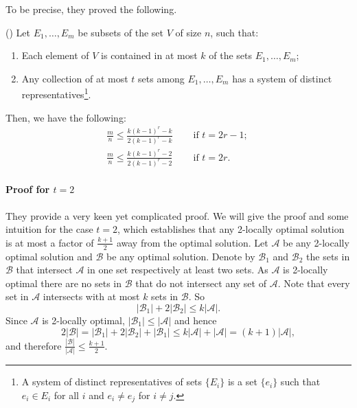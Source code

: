 To be precise, they proved the following.
%
\begin{theorem}\label{thm:HurkensSchrijver}
(\cite[Theorem 1]{HurkensSchrijver}) Let $E_1, \ldots, E_m$ be subsets of the set $V$ of size $n$, such that:
%
\begin{enumerate}
  \item Each element of $V$ is contained in at most $k$ of the sets $E_1, \ldots, E_m$;
  \item Any collection of at most $t$ sets among $E_1, \ldots, E_m$ has a system of distinct representatives\footnote{A system of distinct representatives of sets $\{E_i\}$ is a set $\{e_i\}$ such that $e_i \in E_i$ for all $i$ and $e_i \neq e_j$ for $i \neq j$.}.
\end{enumerate}
%
Then, we have the following:
%
\begin{equation*}
\begin{alignedat}{2}
\frac{m}{n} \leq \frac{ k (k-1)^r - k }{ 2 (k-1)^r - k } \quad & \textrm{ if } t = 2r-1; \ \\
\frac{m}{n} \leq \frac{ k (k-1)^r - 2 }{ 2 (k-1)^r - 2 } \quad & \textrm{ if } t = 2r.
\end{alignedat}
\end{equation*}
\end{theorem}
%
\paragraph{Proof for $t=2$} They provide a very keen yet complicated proof. We will give the proof and some intuition for the case $t=2$, which establishes that any 2-locally optimal solution is at most a factor of $\frac{k+1}{2}$ away from the optimal solution. Let $\mathcal{A}$ be any 2-locally optimal solution and $\mathcal{B}$ be any optimal solution. Denote by $\mathcal{B}_1$ and $\mathcal{B}_2$ the sets in $\mathcal{B}$ that intersect $\mathcal{A}$ in one set respectively at least two sets. As $\mathcal{A}$ is 2-locally optimal there are no sets in $\mathcal{B}$ that do not intersect any set of $\mathcal{A}$. Note that every set in $\mathcal{A}$ intersects with at most $k$ sets in $\mathcal{B}$. So
%
\begin{equation*}
|\mathcal{B}_1| + 2|\mathcal{B}_2| \leq k|\mathcal{A}|.
\end{equation*}
%
Since $\mathcal{A}$ is 2-locally optimal, $|\mathcal{B}_1| \leq |\mathcal{A}|$ and hence
%
\begin{equation*}
2|\mathcal{B}| = |\mathcal{B}_1| + 2|\mathcal{B}_2| + |\mathcal{B}_1| \leq k|\mathcal{A}| + |\mathcal{A}| = (k+1)|\mathcal{A}|,
\end{equation*}
%
and therefore $\frac{|\mathcal{B}|}{|\mathcal{A}|} \leq \frac{k+1}{2}$.

